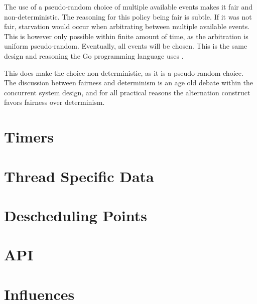 The use of a pseudo\hyp{}random choice of multiple available events makes it fair and non\hyp{}deterministic. The reasoning for this policy being fair is subtle. If it was not fair, starvation would occur when arbitrating between multiple available events. This is however only possible within finite amount of time, as the arbitration is uniform pseudo\hyp{}random. Eventually, all events will be chosen. This is the same design and reasoning the Go programming language uses \citep[see][Select statements]{golangspec}.

This does make the choice non\hyp{}deterministic, as it is a pseudo\hyp{}random choice. The discussion between fairness and determinism is an age old debate within the concurrent system design, and for all practical reasons the alternation construct favors fairness over determinism. 


\section{Timers}




\section{Thread Specific Data}
\label{sec:thread_specific_data}




\section{Descheduling Points}




\section{API}




\section{Influences}



